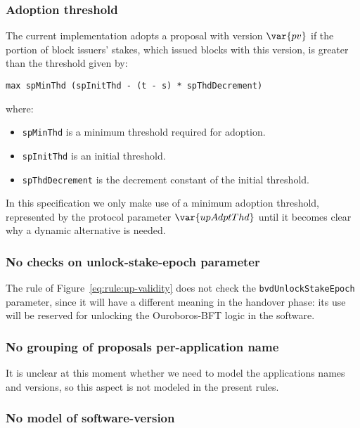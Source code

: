 \subsubsection{Adoption threshold}
\label{sec:adoption-threshold}

The current implementation adopts a proposal with version $\var{pv}$ if the
portion of block issuers' stakes, which issued blocks with this version, is
greater than the threshold given by:

\begin{lstlisting}
max spMinThd (spInitThd - (t - s) * spThdDecrement)
\end{lstlisting}

where:
\begin{itemize}
\item \lstinline{spMinThd} is a minimum threshold required for adoption.
\item \lstinline{spInitThd} is an initial threshold.
\item \lstinline{spThdDecrement} is the decrement constant of the initial
  threshold.
\end{itemize}

In this specification we only make use of a minimum adoption threshold,
represented by the protocol parameter $\var{upAdptThd}$ until it becomes clear
why a dynamic alternative is needed.

\subsubsection{No checks on unlock-stake-epoch parameter}
\label{sec:no-unlock-stake-epoch-check}

The rule of Figure~\ref{eq:rule:up-validity} does not check the
\lstinline{bvdUnlockStakeEpoch} parameter, since it will have a different
meaning in the handover phase: its use will be reserved for unlocking the
Ouroboros-BFT logic in the software.

\subsubsection{No grouping of proposals per-application name}
\label{sec:no-app-up-grouping}

It is unclear at this moment whether we need to model the applications names
and versions, so this aspect is not modeled in the present rules.

\subsubsection{No model of software-version}
\label{sec:no-model-software-version}

